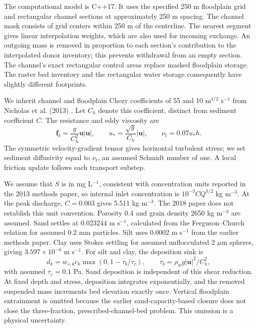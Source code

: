 The computational model is C++17. It uses the specified 250 m floodplain
grid and rectangular channel sections at approximately 250 m spacing.
The channel mask consists of grid centers within 250 m of the centerline.
The nearest segment gives linear interpolation weights, which are also used
for incoming exchange. An outgoing mass is removed in proportion to each
section's contribution to the interpolated donor inventory; this prevents
withdrawal from an empty section. The channel's exact rectangular control
areas replace masked floodplain storage. The raster bed inventory and the
rectangular water storage consequently have slightly different footprints.

We inherit channel and floodplain Chezy coefficients of 55 and 10
m$^{1/2}$ s$^{-1}$ from Nicholas et al. (2013) \cite{nicholas2013}. Let $C_h$ denote this
coefficient, distinct from sediment coefficient $C$. The resistance and
eddy viscosity are
\begin{equation}
 \mathbf f_b=\frac{g}{C_h^2}\mathbf u|\mathbf u|,\qquad
 u_*=\frac{\sqrt g}{C_h}|\mathbf u|,\qquad \nu_t=0.07u_*h.
\end{equation}
The symmetric velocity-gradient tensor gives horizontal turbulent stress;
we set sediment diffusivity equal to $\nu_t$, an assumed Schmidt number of
one. A local friction update follows each transport substep.

We assume that $S$ is in mg L$^{-1}$, consistent with concentration units
reported in the 2013 methods paper, so internal inlet concentration is
$10^{-3}CQ^{3/2}$ kg m$^{-3}$. At the peak discharge, $C=0.003$ gives
5.511 kg m$^{-3}$. The 2018 paper does not establish this unit convention.
Porosity 0.4 and grain density 2650 kg m$^{-3}$ are assumed. Sand settles
at 0.023244 m s$^{-1}$, calculated from the Ferguson--Church relation \cite{ferguson2004} for
assumed 0.2 mm particles. Silt uses 0.0002 m s$^{-1}$ from the earlier
methods paper. Clay uses Stokes settling for assumed unflocculated 2 $\mu$m
spheres, giving $3.597\times10^{-6}$ m s$^{-1}$.
For silt and clay, the deposition sink is
\begin{equation}
 d_k=w_{s,k}c_k\max(0,1-\tau_b/\tau_c),\qquad
 \tau_b=\rho_w g|\mathbf u|^2/C_h^2,
\end{equation}
with assumed $\tau_c=0.1$ Pa. Sand deposition is independent of this shear
reduction. At fixed depth and stress, deposition integrates exponentially,
and the removed suspended mass increments bed elevation exactly once.
Vertical floodplain entrainment is omitted because the earlier
sand-capacity-based closure does not close the three-fraction,
prescribed-channel-bed problem. This omission is a physical uncertainty.

